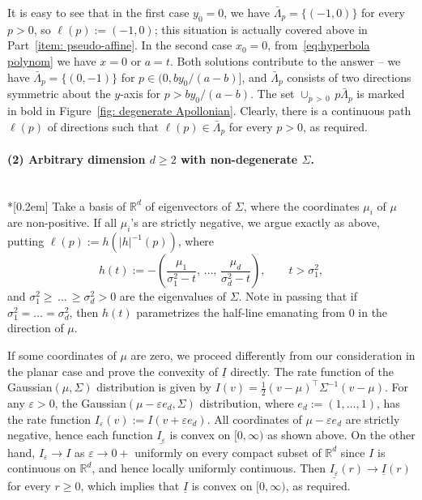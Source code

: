 \documentclass[AHL,Unicode,published]{cedram}
\newcommand{\ubar}[1]{\underline{#1}}
\newcommand{\Rbb}{\mathbb{R}}
\begin{document}
\begin{proofc}
It is easy to see that in the first case $y_0=0$, we have $\bar \Lambda_p = \{(-1, 0)\}$ for every $p>0$, so $\ell(p):=(-1,0)$; this situation is actually covered above in Part~\eqref{item: pseudo-affine}. In the second case $x_0=0$, from~\eqref{eq:hyperbola polynom} we have $x=0$ or $a=t$. Both solutions contribute to the answer -- we have $\bar \Lambda_p = \{(0,-1)\}$ for $p \in (0, b y_0/(a-b)]$, and $\bar \Lambda_p$ consists of two directions symmetric about the $y$-axis for $p >b y_0/(a-b)$. The set $\cup_{p\,>\,0}\,p\bar \Lambda_p$ is marked in bold in Figure~\ref{fig: degenerate Apollonian}. Clearly, there is a continuous path $\ell(p)$ of directions such that $\ell(p) \in \bar \Lambda_p$ for every $p>0$, as required.


\paragraph{\label{part2}(2) Arbitrary dimension $d \ge 2$ with non-degenerate $\Sigma$.}\ \\*[0.2em]
Take a basis of $\Rbb^d$ of eigenvectors of $\Sigma$, where the coordinates $\mu_i$ of $\mu$ are non-positive. If all $\mu_i$'s are strictly negative, we argue exactly as above, putting $\ell(p):=h(|h|^{-1}(p))$, where
\[
h(t):= -\left(\frac{\mu_1}{\sigma_1^2-t},\,\ldots,\,\frac{\mu_d}{\sigma_d^2-t} \right), \qquad t>\sigma_1^2,
\]
and $\sigma_1^2 \ge\,\ldots\,\ge \sigma_d^2 >0$ are the eigenvalues of $\Sigma$. Note in passing that if $\sigma_1^2 = \ldots =\sigma_d^2 $, then $h(t)$ parametrizes the half-line emanating from $0$ in the direction of $\mu$.

If some coordinates of $\mu$ are zero, we proceed differently from our consideration in the planar case and prove the convexity of $\ubar I$ directly. The rate function of the Gaussian$(\mu, \Sigma)$ distribution is given by $I(v)=\frac12 (v-\mu)^\top \Sigma^{-1}(v-\mu)$. For any $\varepsilon >0$, the Gaussian$(\mu-\varepsilon e_d, \Sigma)$ distribution, where $e_d:=(1, \ldots, 1)$, has the rate function $I_\varepsilon(v):=I(v+\varepsilon e_d)$. All coordinates of $\mu-\varepsilon e_d$ are strictly negative, hence each function $\ubar{I_\varepsilon}$ is convex on $[0, \infty)$ as shown above. On the other hand, $I_\varepsilon \to I$ as $\varepsilon \to 0+$ uniformly on every compact subset of $\Rbb^d$ since $I$ is continuous on $\Rbb^d$, and hence locally uniformly continuous. Then $\ubar{I_\varepsilon}(r) \to \ubar I(r)$ for every $r \ge 0$, which implies that $\ubar I$ is convex on $[0, \infty)$, as required.

\end{proofc}
\end{document}
